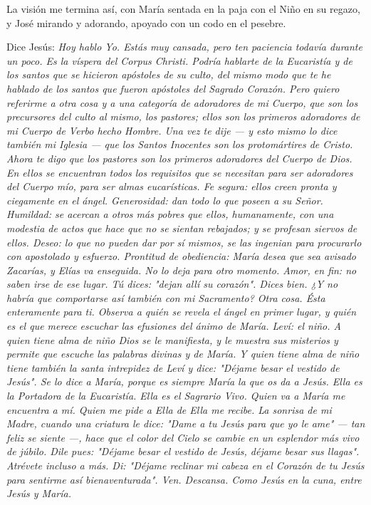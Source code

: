 \documentclass[12pt, twoside, openright]{book} %
\begin{document}
La visión me termina así, con María sentada en la paja con el Niño en su regazo, y José mirando y adorando, apoyado con un codo en el pesebre. 

Dice Jesús: 
\emph{Hoy hablo Yo. Estás muy cansada, pero ten paciencia todavía durante un poco. Es la víspera del Corpus Christi. Podría hablarte de la Eucaristía y de los santos que se hicieron apóstoles de su culto, del mismo modo que te he hablado de los santos que fueron apóstoles del Sagrado Corazón. Pero quiero referirme a otra cosa y a una categoría de adoradores de mi Cuerpo, que son los precursores del culto al mismo, los pastores; ellos son los primeros adoradores de mi Cuerpo de Verbo hecho Hombre. Una vez te dije — y esto mismo lo dice también mi Iglesia — que los Santos Inocentes son los protomártires de Cristo. Ahora te digo que los pastores son los primeros adoradores del Cuerpo de Dios. En ellos se encuentran todos los requisitos que se necesitan para ser adoradores del Cuerpo mío, para ser almas eucarísticas. Fe segura: ellos creen pronta y ciegamente en el ángel. Generosidad: dan todo lo que poseen a su Señor. Humildad: se acercan a otros más pobres que ellos, humanamente, con una modestia de actos que hace que no se sientan rebajados; y se profesan siervos de ellos. Deseo: lo que no pueden dar por sí mismos, se las ingenian para procurarlo con apostolado y esfuerzo. Prontitud de obediencia: María desea que sea avisado Zacarías, y Elías va enseguida. No lo deja para otro momento. Amor, en fin: no saben irse de ese lugar. Tú dices: "dejan allí su corazón". Dices bien. ¿Y no habría que comportarse así también con mi Sacramento? Otra cosa. Ésta enteramente para ti. Observa a quién se revela el ángel en primer lugar, y quién es el que merece escuchar las efusiones del ánimo de María. Leví: el niño. A quien tiene alma de niño Dios se le manifiesta, y le muestra sus misterios y permite que escuche las palabras divinas y de María. Y quien tiene alma de niño tiene también la santa intrepidez de Leví y dice: "Déjame besar el vestido de Jesús". Se lo dice a María, porque es siempre María la que os da a Jesús. Ella es la Portadora de la Eucaristía. Ella es el Sagrario Vivo. Quien va a María me encuentra a mí. Quien me pide a Ella de Ella me recibe. La sonrisa de mi Madre, cuando una criatura le dice: "Dame a tu Jesús para que yo le ame" — tan feliz se siente —, hace que el color del Cielo se cambie en un esplendor más vivo de júbilo. Dile pues: "Déjame besar el vestido de Jesús, déjame besar sus llagas". Atrévete incluso a más. Di: "Déjame reclinar mi cabeza en el Corazón de tu Jesús para sentirme así bienaventurada". Ven. Descansa. Como Jesús en la cuna, entre Jesús y María.  }
\end{document}
